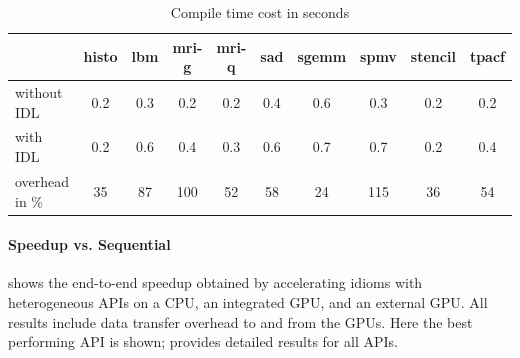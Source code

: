 \begin{table}[t]
\begin{tabular}{lccccccccc}
  \toprule
  & \hspace{0.44mm}histo\hspace{0.44mm}
  & \hspace{0.44mm}lbm\hspace{0.44mm}
  & \hspace{0.44mm}mri-g\hspace{0.44mm}
  & \hspace{0.44mm}mri-q\hspace{0.44mm}
  & \hspace{0.44mm}sad\hspace{0.44mm}
  & \hspace{0.44mm}sgemm\hspace{0.44mm}
  & \hspace{0.44mm}spmv\hspace{0.44mm}
  & \hspace{0.44mm}stencil\hspace{0.44mm}
  & \hspace{0.44mm}tpacf\hspace{0.44mm} \\
  \midrule
without IDL    & 0.2 & 0.3 & 0.2 & 0.2 & 0.4 & 0.6 & 0.3 & 0.2 & 0.2 \\[0.25em]
with IDL       & 0.2 & 0.6 & 0.4 & 0.3 & 0.6 & 0.7 & 0.7 & 0.2 & 0.4 \\[0.75em]
overhead in \% &  35 &  87 & 100 &  52 &  58 &  24 & 115 &  36 &  54 \\
  \bottomrule
\end{tabular}
\caption{Compile time cost in seconds}
\label{tab:compiletimecost}
\end{table}

\paragraph*{Speedup vs. Sequential}
 shows the end-to-end speedup obtained by accelerating idioms with heterogeneous APIs on a CPU, an integrated GPU, and an external GPU.
All results include data transfer overhead to and from the GPUs.
Here the best performing API is shown;
 provides detailed results for all APIs. 

